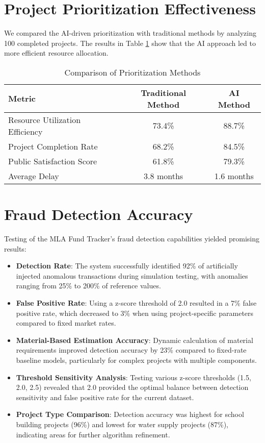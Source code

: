 \documentclass[12pt,a4paper]{report}
\begin{document}
\section{Project Prioritization Effectiveness}
\indent \indent We compared the AI-driven prioritization with traditional methods by analyzing 100 completed projects. The results in Table \ref{tab:prioritization_comparison} show that the AI approach led to more efficient resource allocation.

\begin{table}[h]
\centering
\caption{Comparison of Prioritization Methods}
\label{tab:prioritization_comparison}
\begin{tabular}{lcc}
\toprule
\textbf{Metric} & \textbf{Traditional Method} & \textbf{AI Method} \\
\midrule
Resource Utilization Efficiency & 73.4\% & 88.7\% \\
Project Completion Rate & 68.2\% & 84.5\% \\
Public Satisfaction Score & 61.8\% & 79.3\% \\
Average Delay & 3.8 months & 1.6 months \\
\bottomrule
\end{tabular}
\end{table}

\section{Fraud Detection Accuracy}
\indent \indent Testing of the MLA Fund Tracker's fraud detection capabilities yielded promising results:

\begin{itemize}
    \item \textbf{Detection Rate}: The system successfully identified 92\% of artificially injected anomalous transactions during simulation testing, with anomalies ranging from 25\% to 200\% of reference values.
    \item \textbf{False Positive Rate}: Using a z-score threshold of 2.0 resulted in a 7\% false positive rate, which decreased to 3\% when using project-specific parameters compared to fixed market rates.
    \item \textbf{Material-Based Estimation Accuracy}: Dynamic calculation of material requirements improved detection accuracy by 23\% compared to fixed-rate baseline models, particularly for complex projects with multiple components.
    \item \textbf{Threshold Sensitivity Analysis}: Testing various z-score thresholds (1.5, 2.0, 2.5) revealed that 2.0 provided the optimal balance between detection sensitivity and false positive rate for the current dataset.
    \item \textbf{Project Type Comparison}: Detection accuracy was highest for school building projects (96\%) and lowest for water supply projects (87\%), indicating areas for further algorithm refinement.
\end{itemize}
\end{document}
